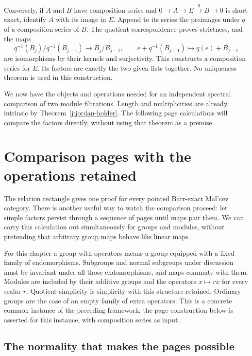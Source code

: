 \documentclass[11pt]{article}
\theoremstyle{definition}
\theoremstyle{remark}\newtheorem{remark}[theorem]{Remark}
\begin{document}
Conversely, if $A$ and $B$ have composition series and
$0\to A\to E\xrightarrow{q}B\to0$ is short exact, identify $A$
with its image in $E$. Append to its series the preimages under $q$
of a composition series of $B$. The quotient correspondence proves
strictness, and the maps
\[
 q^{-1}(B_j)/q^{-1}(B_{j-1})\longrightarrow B_j/B_{j-1},\qquad
 e+q^{-1}(B_{j-1})\longmapsto q(e)+B_{j-1}
\]
are isomorphisms by their kernels and surjectivity. This constructs
a composition series for $E$. Its factors are exactly the two given
lists together. No uniqueness theorem is used in this construction.

We now have the objects and operations needed for an independent
spectral comparison of two module filtrations. Length and multiplicities
are already intrinsic by Theorem~\ref{j:jordan-holder}. The following
page calculations will compare the factors directly, without using that
theorem as a premise.



\section{Comparison pages with the operations retained}
\label{p:chapter}

The relation rectangle gives one proof for every pointed Barr-exact
Mal'cev category. There is another useful way to watch the comparison
proceed: let simple factors persist through a sequence of pages until
maps pair them. We can carry this calculation out simultaneously for
groups and modules, without pretending that arbitrary group maps behave
like linear maps.

For this chapter a group with operators means a group equipped with a
fixed family of endomorphisms. Subgroups and normal subgroups under
discussion must be invariant under all those endomorphisms, and maps
commute with them. Modules are included by their additive groups and the
operators $x\mapsto rx$ for every scalar $r$. Quotient simplicity is
simplicity with this structure retained. Ordinary groups are the case
of an empty family of extra operators. This is a concrete common instance
of the preceding framework; the page construction below is asserted for
this instance, with composition series as input.

\subsection{The normality that makes the pages possible}
\end{document}
